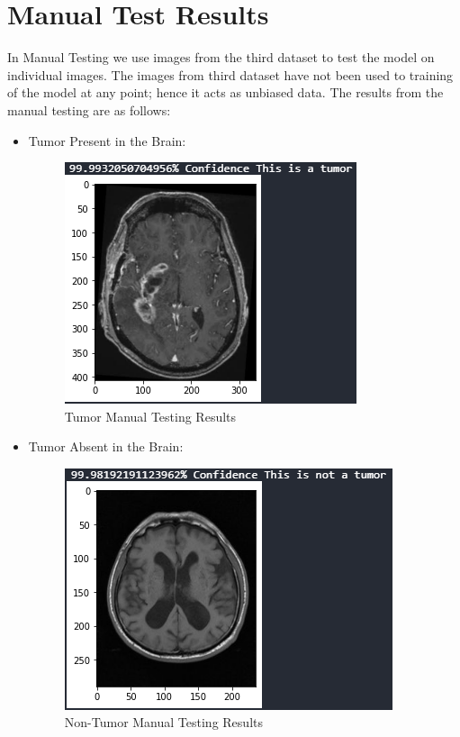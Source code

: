 \section{Manual Test Results}
In Manual Testing we use images from the third dataset to test the model on individual images. The images from third dataset have not been used to training of the model at any point; hence it acts as unbiased data. The results from the manual testing are as follows:
\begin{itemize}
    \item Tumor Present in the Brain:
        \begin{figure}[H]
        \includegraphics[scale=0.8]{Photos/Tumor_Manual_Result.PNG}
        \caption{Tumor Manual Testing Results} \label{fig:ishan}
        \end{figure}
    \item Tumor Absent in the Brain:
        \begin{figure}[H]
        \includegraphics[scale=0.8]{Photos/Non_Tumor_Manual_Result.PNG}
        \caption{Non-Tumor Manual Testing Results} \label{fig:ishan}
        \end{figure}
\end{itemize}